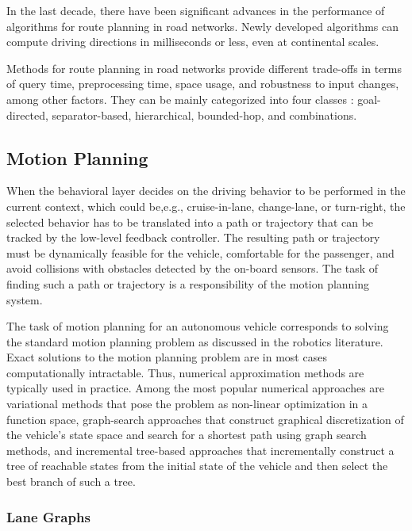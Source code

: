In the last decade, there have been significant advances in the performance of
algorithms for route planning in road networks. Newly developed algorithms can
compute driving directions in milliseconds or less, even at continental scales.

Methods for route planning in road networks provide different trade-offs in
terms of query time, preprocessing time, space usage, and robustness to input
changes, among other factors. They can be mainly categorized into four classes
: goal-directed, separator-based, hierarchical, bounded-hop, and
combinations.

\subsection{Motion Planning}

When the behavioral layer decides on the driving behavior to  be  performed  in
the  current  context,  which  could  be,e.g.,  cruise-in-lane,  change-lane,
or  turn-right,  the  selected behavior  has  to  be  translated  into  a  path
or  trajectory  that can  be  tracked  by  the  low-level  feedback  controller.
The resulting  path  or  trajectory  must  be  dynamically  feasible  for the
vehicle, comfortable for the passenger, and avoid collisions with  obstacles
detected  by  the  on-board  sensors.  The  task  of finding  such  a  path  or
trajectory  is  a  responsibility  of  the motion planning system.

The  task  of motion  planning  for  an  autonomous  vehicle corresponds to
solving the standard motion planning problem as  discussed  in  the  robotics
literature. Exact  solutions  to  the motion  planning  problem  are  in  most
cases computationally intractable.  Thus,  numerical  approximation  methods
are typically  used  in  practice.  Among  the  most  popular  numerical
approaches are  variational  methods  that  pose  the  problem  as non-linear
optimization in a function space, graph-search approaches that construct
graphical discretization of the vehicle’s state space and search for a shortest
path using graph search methods,  and  incremental  tree-based  approaches  that
incrementally  construct  a  tree  of  reachable  states  from  the initial
state of the vehicle and then select the best branch of such a tree.

\subsubsection{Lane Graphs}

